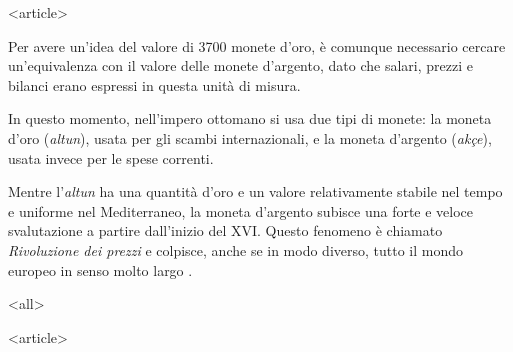 \mode
<article>

Per  avere  un'idea  del  valore  di 3700  monete  d'oro,  è  comunque
necessario   cercare  un'equivalenza  con   il  valore   delle  monete
d'argento, dato che salari, prezzi  e bilanci erano espressi in questa
unità di misura.

In questo momento, nell'impero ottomano  si usa due tipi di monete: la
moneta d'oro ({\it altun}), usata  per gli scambi internazionali, e la
moneta d'argento ({\it akçe}), usata invece per le spese correnti.

Mentre l'{\it altun}  ha una quantità d'oro e  un valore relativamente
stabile  nel tempo e  uniforme nel  Mediterraneo, la  moneta d'argento
subisce una forte e veloce svalutazione a partire dall'inizio del XVI.
Questo fenomeno  è chiamato {\it  Rivoluzione dei prezzi}  e colpisce,
anche se in modo diverso, tutto  il mondo europeo in senso molto largo
\cite{braudel1982,barkan1975,pamuk2001}.

\mode
<all>




\mode
<article>

